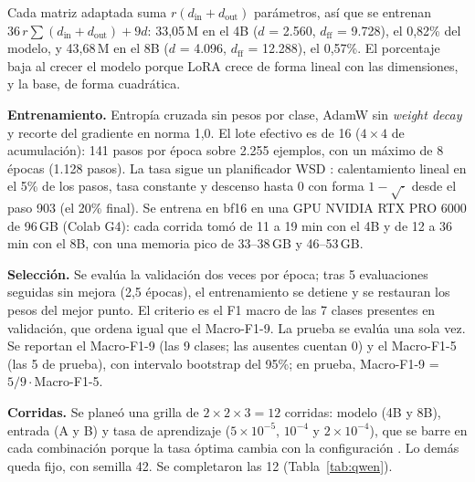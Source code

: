 \documentclass[10pt,a4paper,twocolumn]{article}
\begin{document}
Cada matriz adaptada suma $r(d_\mathrm{in}+d_\mathrm{out})$ parámetros, así que se entrenan $36\,r\sum(d_\mathrm{in}+d_\mathrm{out})+9d$: 33,05\,M en el 4B ($d$ = 2.560, $d_\mathrm{ff}$ = 9.728), el 0,82\% del modelo, y 43,68\,M en el 8B ($d$ = 4.096, $d_\mathrm{ff}$ = 12.288), el 0,57\%. El porcentaje baja al crecer el modelo porque LoRA crece de forma lineal con las dimensiones, y la base, de forma cuadrática.

\textbf{Entrenamiento.} Entropía cruzada sin pesos por clase, AdamW sin \emph{weight decay} y recorte del gradiente en norma 1,0. El lote efectivo es de 16 ($4\times4$ de acumulación): 141 pasos por época sobre 2.255 ejemplos, con un máximo de 8 épocas (1.128 pasos). La tasa sigue un planificador WSD \cite{minicpm,hagele}: calentamiento lineal en el 5\% de los pasos, tasa constante y descenso hasta 0 con forma $1-\sqrt{\cdot}$ desde el paso 903 (el 20\% final). Se entrena en bf16 en una GPU NVIDIA RTX PRO 6000 de 96\,GB (Colab G4): cada corrida tomó de 11 a 19 min con el 4B y de 12 a 36 min con el 8B, con una memoria pico de 33--38\,GB y 46--53\,GB.

\textbf{Selección.} Se evalúa la validación dos veces por época; tras 5 evaluaciones seguidas sin mejora (2,5 épocas), el entrenamiento se detiene y se restauran los pesos del mejor punto. El criterio es el F1 macro de las 7 clases presentes en validación, que ordena igual que el Macro-F1-9. La prueba se evalúa una sola vez. Se reportan el Macro-F1-9 (las 9 clases; las ausentes cuentan 0) y el Macro-F1-5 (las 5 de prueba), con intervalo bootstrap del 95\%; en prueba, Macro-F1-9 = $5/9\cdot{}$Macro-F1-5.

\textbf{Corridas.} Se planeó una grilla de $2\times2\times3=12$ corridas: modelo (4B y 8B), entrada (A y B) y tasa de aprendizaje ($5\times10^{-5}$, $10^{-4}$ y $2\times10^{-4}$), que se barre en cada combinación porque la tasa óptima cambia con la configuración \cite{lee}. Lo demás queda fijo, con semilla 42. Se completaron las 12 (Tabla~\ref{tab:qwen}).
\end{document}

